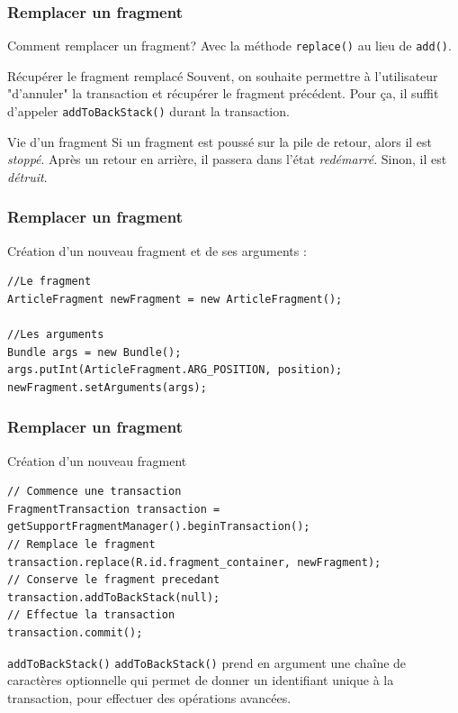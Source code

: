 \documentclass{beamer}
\begin{document}
\begin{frame}
\frametitle{Remplacer un fragment}

\begin{block}{Comment remplacer un fragment?}
Avec la méthode \verb!replace()! au lieu de \verb!add()!.
\end{block}
\pause
\begin{block}{Récupérer le fragment remplacé}
Souvent, on souhaite permettre à l'utilisateur "d'annuler"
la transaction et récupérer le fragment précédent.
Pour ça, il suffit d'appeler \verb!addToBackStack()! durant
la transaction.
\end{block}
\pause
\begin{block}{Vie d'un fragment}
Si un fragment est poussé sur la pile de retour, alors il est \emph{stoppé}. Après un retour en arrière, il passera dans l'état \emph{redémarré}. Sinon, il est \emph{détruit}.
\end{block}

\end{frame}

\begin{frame}[fragile]
\frametitle{Remplacer un fragment}

\begin{exampleblock}{Création d'un nouveau fragment et de ses arguments :}
\begin{lstlisting}
//Le fragment
ArticleFragment newFragment = new ArticleFragment();

//Les arguments
Bundle args = new Bundle();
args.putInt(ArticleFragment.ARG_POSITION, position);
newFragment.setArguments(args);
\end{lstlisting}
\end{exampleblock}

\end{frame}
\begin{frame}[fragile]
\frametitle{Remplacer un fragment}

\begin{exampleblock}{Création d'un nouveau fragment}
\begin{lstlisting}
// Commence une transaction
FragmentTransaction transaction = getSupportFragmentManager().beginTransaction();
// Remplace le fragment
transaction.replace(R.id.fragment_container, newFragment);
// Conserve le fragment precedant
transaction.addToBackStack(null);
// Effectue la transaction
transaction.commit();
\end{lstlisting}
\end{exampleblock}


\begin{block}{\verb!addToBackStack()!}
\verb!addToBackStack()! prend en argument une chaîne de caractères optionnelle qui permet de donner un identifiant unique à la transaction, pour effectuer des opérations avancées.
\end{block}

\end{frame}
\end{document}
